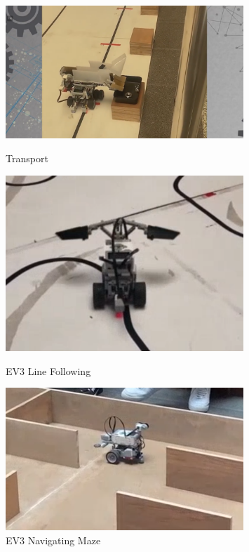 \documentclass[10pt, letterpaper]{article}
\begin{document}
\begin{figure}[htbp]
        \vspace{1.6cm}

        \begin{minipage}[c]{0.33\linewidth}
            \centering
            \includegraphics[width=0.8\textwidth]{fig/Robot Design/運輸.png}
            \caption{Transport}
        \end{minipage}
        \begin{minipage}[c]{0.33\linewidth}
            \centering
            \includegraphics[width=0.8\textwidth]{fig/Robot Design/循跡.png}
            \caption{EV3 Line Following}
        \end{minipage}
        \begin{minipage}[c]{0.33\linewidth}
            \centering
            \includegraphics[width=0.8\textwidth]{fig/Robot Design/走迷宮.png}
            \caption{EV3 Navigating Maze}
        \end{minipage}            
    \end{figure}
        
\end{document}
